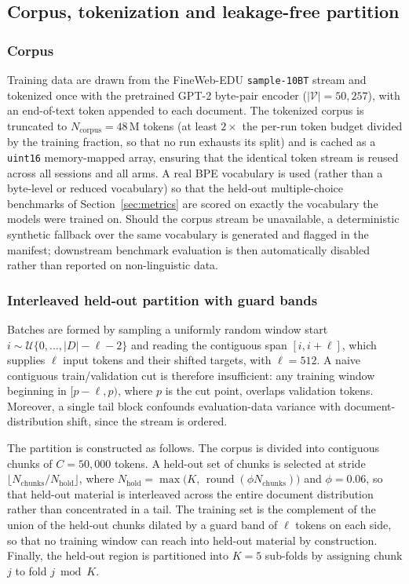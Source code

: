 \documentclass[final,5p,times,twocolumn]{elsarticle}
\theoremstyle{remark}
\newcommand{\round}{\operatorname{round}}
\begin{document}
\subsection{Corpus, tokenization and leakage-free partition}
\label{sec:data}

\subsubsection{Corpus}

Training data are drawn from the FineWeb-EDU \texttt{sample-10BT} stream
\cite{penedo2024} and tokenized once with the pretrained GPT-2 byte-pair
encoder \cite{radford2019}
($|\mathcal{V}| = 50{,}257$), with an end-of-text token appended to each
document. The tokenized corpus is truncated to $N_{\mathrm{corpus}} = 48$\,M
tokens (at least $2\times$ the per-run token budget divided by the training
fraction, so that no run exhausts its split) and is cached as a
\texttt{uint16} memory-mapped array, ensuring that the identical token stream is
reused across all sessions and all arms. A real BPE vocabulary is used
(rather than a byte-level or reduced vocabulary) so that the held-out
multiple-choice benchmarks of Section~\ref{sec:metrics} are scored on exactly
the vocabulary the models were trained on. Should the corpus stream be
unavailable, a deterministic synthetic fallback over the same vocabulary is
generated and flagged in the manifest; downstream benchmark evaluation is then
automatically disabled rather than reported on non-linguistic data.

\subsubsection{Interleaved held-out partition with guard bands}

Batches are formed by sampling a uniformly random window start
$i \sim \mathcal{U}\{0,\dots,|D|-\ell-2\}$ and reading the contiguous span
$[i, i+\ell]$, which supplies $\ell$ input tokens and their shifted targets,
with $\ell = 512$. A naive contiguous train/validation cut is
therefore insufficient: any training window beginning in $[p-\ell, p)$, where
$p$ is the cut point, overlaps validation tokens. Moreover, a single tail block
confounds evaluation-data variance with document-distribution shift, since the
stream is ordered.

The partition is constructed as follows. The corpus is divided into contiguous
chunks of $C = 50{,}000$ tokens. A held-out set of chunks is selected at stride
$\lfloor N_{\mathrm{chunks}} / N_{\mathrm{hold}} \rfloor$, where
$N_{\mathrm{hold}} = \max\!\big(K,\, \round(\phi N_{\mathrm{chunks}})\big)$
and $\phi = 0.06$, so that held-out material is interleaved across the entire
document distribution rather than concentrated in a tail. The training set is
the complement of the union of the held-out chunks dilated by a guard band
of $\ell$ tokens on each side, so that no training window can reach into
held-out material by construction. Finally, the held-out region is partitioned
into $K = 5$ sub-folds by assigning chunk $j$ to fold $j \bmod K$.
\end{document}
